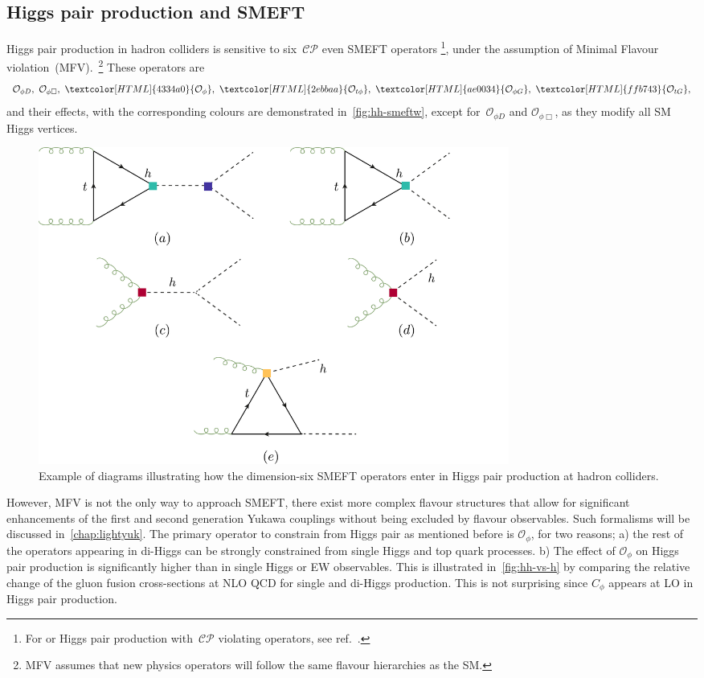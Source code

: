 \subsection{Higgs pair production and SMEFT}
Higgs pair production in hadron colliders is sensitive to six~$\mathcal{CP}$ even SMEFT operators \footnote{For or Higgs pair production with~$\mathcal{CP}$ violating operators, see ref.~\cite{Grober:2017gut}. }, under the assumption of Minimal Flavour violation~(MFV).~\footnote{MFV assumes that new physics operators will follow the same flavour hierarchies as the SM.} These operators are
\begin{equation}
	\mathcal{O}_{\phi D},\ \mathcal{O}_{\phi \Box},\ \textcolor[HTML]{4334a0}{\mathcal{O}_{\phi}}, \ 	\textcolor[HTML]{2ebbaa}{\mathcal{O}_{t\phi}}, \ 	\textcolor[HTML]{ae0034}{\mathcal{O}_{\phi G}},\ \textcolor[HTML]{ffb743}{\mathcal{O}_{t G}},
	\label{HH-smeft}
\end{equation}
and their effects, with the corresponding colours are demonstrated in~\autoref{fig:hh-smeftw}, except for~$\mathcal{O}_{\phi D}$ and  $\mathcal{O}_{\phi \Box}$, as they modify all SM Higgs vertices. 
\begin{figure}[t!]
	\begin{center}
		\includegraphics[width=0.75\textwidth]{figures/hh-smeft}
		\caption{ Example of diagrams illustrating how the dimension-six SMEFT operators enter in Higgs pair production at hadron colliders. \label{fig:hh-smeftw} }
	\end{center}
\end{figure}
However, MFV is not the only way to approach SMEFT, there exist more complex flavour structures that allow for significant enhancements of the first and second generation Yukawa couplings without being excluded by flavour observables. Such formalisms will be discussed in~\autoref{chap:lightyuk}.
The primary operator to constrain from Higgs pair as mentioned before is $\mathcal{O}_{\phi}$, for two reasons; a) the rest of the operators appearing in di-Higgs can be strongly constrained from single Higgs and top quark processes. b) The effect of $\mathcal{O}_{\phi}$ on Higgs pair production is significantly higher than in single Higgs or EW observables. This is illustrated in~\autoref{fig:hh-vs-h} by comparing the relative change of the gluon fusion cross-sections at NLO QCD for single and di-Higgs production. This is not surprising since $C_\phi$ appears at LO in Higgs pair production.

